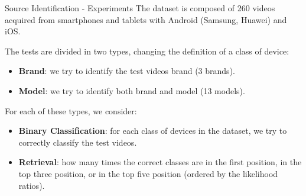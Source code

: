 \begin{tframe}{Source Identification - Experiments}
The dataset is composed of 260 videos acquired from smartphones and tablets with Android (Samsung, Huawei) and iOS.
\vspace{0.2cm}

The tests are divided in two types, changing the definition of a class of device:

\begin{itemize}
\item \textbf{Brand}: we try to identify the test videos brand (3 brands).
\vspace{0.1cm}
\item \textbf{Model}: we try to identify both brand and model (13 models).
\end{itemize}
\vspace{0.2cm}

For each of these types, we consider:

\begin{itemize}
\item \textbf{Binary Classification}: for each class of devices in the dataset, we try to correctly classify the test videos.
\vspace{0.1cm}
\item \textbf{Retrieval}: how many times the correct classes are in the first position, in the top three position, or in the top five position (ordered by the likelihood ratios).
\end{itemize}

\end{tframe}

